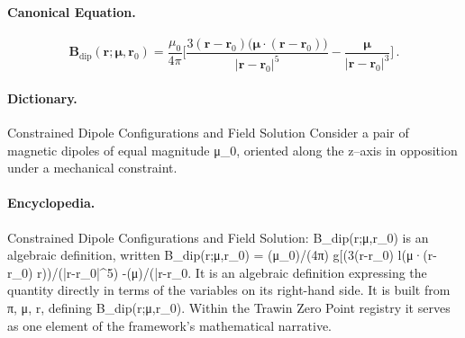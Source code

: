 \paragraph{Canonical Equation.}
\[
\mathbf{B}_{\mathrm{dip}}(\mathbf{r};\boldsymbol{\mu},\mathbf{r}_0) = \frac{\mu_0}{4\pi}\Bigg[\frac{3(\mathbf{r}-\mathbf{r}_0)\bigl(\boldsymbol{\mu}\cdot(\mathbf{r}-\mathbf{r}_0)\bigr)}{|\mathbf{r}-\mathbf{r}_0|^5} -\frac{\boldsymbol{\mu}}{|\mathbf{r}-\mathbf{r}_0|^3}\Bigg]\,.
\]

\paragraph{Dictionary.}
Constrained Dipole Configurations and Field Solution Consider a pair of magnetic dipoles of equal magnitude μ\_0, oriented along the z--axis in opposition under a mechanical constraint.

\paragraph{Encyclopedia.}
Constrained Dipole Configurations and Field Solution: B\_dip(r;μ,r\_0) is an algebraic definition, written B\_dip(r;μ,r\_0) = (μ\_0)/(4π) g[(3(r-r\_0) l(μ·(r-r\_0) r))/(|r-r\_0|\textasciicircum{}5) -(μ)/(|r-r\_0. It is an algebraic definition expressing the quantity directly in terms of the variables on its right-hand side. It is built from π, μ, r, defining B\_dip(r;μ,r\_0). Within the Trawin Zero Point registry it serves as one element of the framework's mathematical narrative.

